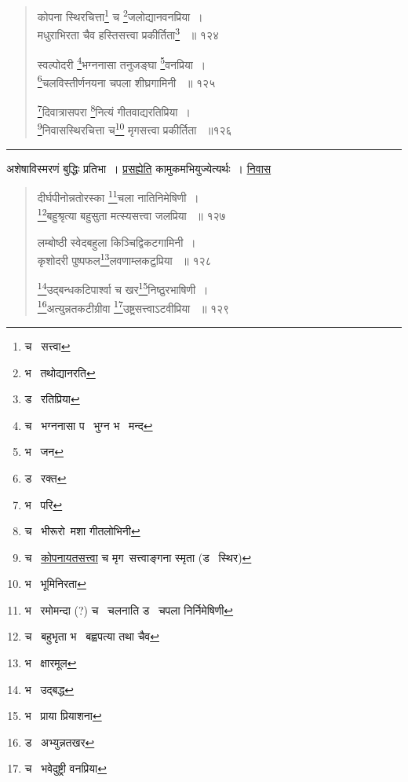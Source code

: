 \documentclass[11pt, openany]{book}
\begin{document}
{\begin{quote}
{कोपना स्थिरचित्ता\renewcommand{\thefootnote}{11}\footnote{च \textendash\ सत्त्वा} च \renewcommand{\thefootnote}{12}\footnote{भ \textendash\ तथोद्यानरति }जलोद्यानवनप्रिया~। \\
मधुराभिरता चैव हस्तिसत्त्वा प्रकीर्तिता\renewcommand{\thefootnote}{13}\footnote{ड \textendash\ रतिप्रिया } ~॥ १२४ 

स्वल्पोदरी \renewcommand{\thefootnote}{14}\footnote{च \textendash\ भग्ननासा प \textendash\ भुग्न भ \textendash\ मन्द }भग्ननासा तनुजङ्घा \renewcommand{\thefootnote}{15}\footnote{भ \textendash\ जन }वनप्रिया~।\\
\renewcommand{\thefootnote}{16}\footnote{ड \textendash\ रक्त}चलविस्तीर्णनयना चपला शीघ्रगामिनी ~॥ १२५ 

\renewcommand{\thefootnote}{17}\footnote{भ \textendash\ परि }दिवात्रासपरा \renewcommand{\thefootnote}{18}\footnote{च \textendash\ भीरूरो\textendash\ मशा गीतलोभिनी}नित्यं गीतवाद्यरतिप्रिया~। \\
\renewcommand{\thefootnote}{20}\footnote{च \textendash\ \underline{कोपनायतसत्त्वा} च मृग\textendash\ सत्त्वाङ्गना स्मृता (ड \textendash\ स्थिर) }निवासस्थिरचित्ता च\renewcommand{\thefootnote}{21}\footnote{ भ \textendash\ भूमिनिरता } मृगसत्त्वा प्रकीर्तिता ~॥१२६}
\end{quote}

\hrule

\vspace{2mm}

\noindent
अशेषाविस्मरणं बुद्धिः प्रतिभा~। \underline{प्रसह्येति} कामुकमभियुज्येत्यर्थः~। \underline{निवास }

\newpage

\begin{quote}
 {\na दीर्घपीनोन्नतोरस्का \renewcommand{\thefootnote}{1}\footnote{भ \textendash\ रमोमन्दा (?) च \textendash\ चलनाति ड \textendash\ चपला निर्निमेषिणी }चला नातिनिमेषिणी~। \\
\renewcommand{\thefootnote}{2}\footnote{च \textendash\ बहुभृता भ \textendash\ बह्वपत्या तथा चैव }बहुश्रृत्या बहुसुता मत्स्यसत्त्वा जलप्रिया ~॥ १२७ 

लम्बोष्ठी स्वेदबहुला किञ्चिद्विकटगामिनी~।\\ 
कृशोदरी पुष्पफल\renewcommand{\thefootnote}{3}\footnote{भ \textendash\ क्षारमूल}लवणाम्लकटुप्रिया ~॥ १२८ 

\renewcommand{\thefootnote}{4}\footnote{भ \textendash\ उद्बद्ध}उद्बन्धकटिपार्श्वा च खर\renewcommand{\thefootnote}{5}\footnote{भ \textendash\ प्राया प्रियाशना}निष्ठुरभाषिणी~। \\
\renewcommand{\thefootnote}{6}\footnote{ड \textendash\ अभ्युन्नतखर }अत्युन्नतकटीग्रीवा \renewcommand{\thefootnote}{7}\footnote{च \textendash\ भवेदुष्ट्री वनप्रिया }उष्ट्रसत्त्वाऽटवीप्रिया ~॥ १२९ 

}
\end{quote}}
\end{document}
